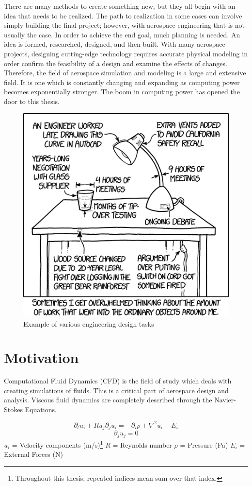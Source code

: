 

There are many methods to create something new, but they all begin with an idea that needs to be realized. The path to realization in some cases can involve simply building the final project; however, with aerospace engineering that is not usually the case. In order to achieve the end goal, much planning is needed. An idea is formed, researched, designed, and then built. With many aerospace projects, designing cutting-edge technology requires accurate physical modeling in order confirm the feasibility of a design and examine the effects of changes. Therefore, the field of aerospace simulation and modeling is a large and extensive field. It is one which is constantly changing and expanding as computing power becomes exponentially stronger. The boom in computing power has opened the door to this thesis. \par

\begin{figure}[ht]
    \includegraphics[width=.45\textwidth]{figures/work.png}
    \centering
    \caption[Example of various engineering design tasks]{Example of various engineering design tasks \textmd{\cite{xkcd}}}
    \label{fig:xkcd}
\end{figure}


\section{Motivation}





\indent Computational Fluid Dynamics (CFD) is the field of study which deals with creating simulations of fluids. This is a critical part of aerospace design and analysis. Viscous fluid dynamics are completely described through the Navier-Stokes Equations.

\begin{equation}
    \label{eqn:navier_1}
    \partial_t u_i + R u_j \partial_j u_i = -\partial_i \rho + \nabla^2 u_i + E_i 
\end{equation}
\begin{equation}
    \label{eqn:navier_2}
        \partial_j u_j = 0  
\end{equation}
\(u_i\) = Velocity components (m/s)\footnote{Throughout this thesis, repeated indices mean sum over that index.} \newline
\(R\) = Reynolds number \newline
\(\rho\) = Pressure (Pa) \newline
\(E_i\) = External Forces (N) \par



